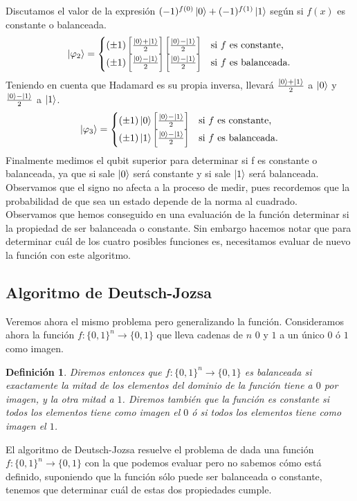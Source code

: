 \documentclass[a4paper]{article}
\newtheorem{deff}{Definición}[section]
\numberwithin{equation}{section}
\begin{document}
Discutamos el valor de la expresión $(-1)^{f(0)} \ket{0} + (-1)^{f(1)} \ket{1}$ según si $f(x)$ es constante o balanceada.
\begin{equation}
\ket{\varphi_2} = 
\begin{cases}
(\pm 1) \left[\frac{\ket{0}+\ket{1}}{2}\right] \left[\frac{\ket{0}-\ket{1}}{2}\right] & \textrm{si } f \textrm{ es constante,} \\
(\pm 1) \left[\frac{\ket{0}-\ket{1}}{2}\right] \left[\frac{\ket{0}-\ket{1}}{2}\right] & \textrm{si } f \textrm{ es balanceada.}
\end{cases}
\end{equation}
Teniendo en cuenta que Hadamard es su propia inversa, llevará $\frac{\ket{0}+\ket{1}}{2}$ a $\ket{0}$ y $\frac{\ket{0}-\ket{1}}{2}$ a $\ket{1}$.
\begin{equation}
\ket{\varphi_3} = 
\begin{cases}
(\pm 1) \ket{0} \left[\frac{\ket{0}-\ket{1}}{2}\right] & \textrm{si } f \textrm{ es constante,} \\
(\pm 1) \ket{1} \left[\frac{\ket{0}-\ket{1}}{2}\right] & \textrm{si } f \textrm{ es balanceada.}
\end{cases}
\end{equation}
Finalmente medimos el qubit superior para determinar si f es constante o balanceada, ya que si sale $\ket{0}$ será constante y si sale $\ket{1}$ será balanceada. Observamos que el signo no afecta a la proceso de medir, pues recordemos que la probabilidad de que sea un estado depende de la norma al cuadrado.\\
Observamos que hemos conseguido en una evaluación de la función determinar si la propiedad de ser balanceada o constante. Sin embargo hacemos notar que para determinar cuál de los cuatro posibles funciones es, necesitamos evaluar de nuevo la función con este algoritmo.

\newpage

\subsection{Algoritmo de Deutsch-Jozsa}
Veremos ahora el mismo problema pero generalizando la función. Consideramos ahora la función $f:\{0, 1\}^n \longrightarrow \{0, 1\}$ que lleva cadenas de $n$ $0$ y $1$ a un único $0$ ó $1$ como imagen.\\
\begin{deff}
Diremos entonces que $f:\{0, 1\}^n \longrightarrow \{0, 1\}$ es balanceada si exactamente la mitad de los elementos del dominio de la función tiene a $0$ por imagen, y la otra mitad a $1$. Diremos también que la función es constante si todos los elementos tiene como imagen el $0$ ó si todos los elementos tiene como imagen el $1$.
\end{deff}
El algoritmo de Deutsch-Jozsa resuelve el problema de dada una función $f:\{0, 1\}^n \longrightarrow \{0, 1\}$ con la que podemos evaluar pero no sabemos cómo está definido, suponiendo que la función sólo puede ser balanceada o constante, tenemos que determinar cuál de estas dos propiedades cumple.\\
\end{document}

